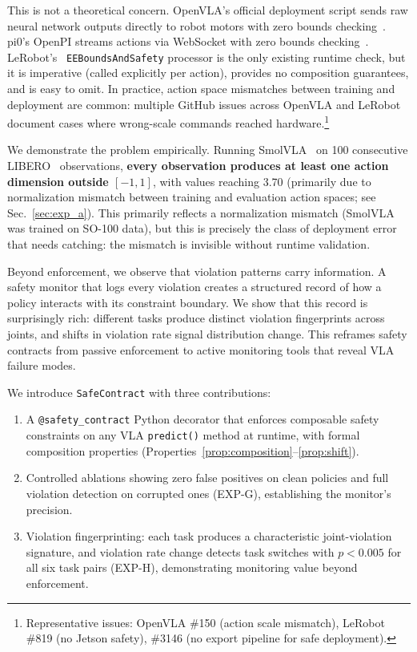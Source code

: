 \documentclass[conference]{IEEEtran}
\begin{document}
This is not a theoretical concern.
OpenVLA's official deployment script sends raw neural network outputs directly to robot motors with zero bounds checking~\cite{openvla}.
pi0's OpenPI streams actions via WebSocket with zero bounds checking~\cite{pi0}.
LeRobot's~\cite{lerobot} \texttt{EEBoundsAndSafety} processor is the only existing runtime check, but it is imperative (called explicitly per action), provides no composition guarantees, and is easy to omit.
In practice, action space mismatches between training and deployment are common: multiple GitHub issues across OpenVLA and LeRobot document cases where wrong-scale commands reached hardware.\footnote{Representative issues: OpenVLA \#150 (action scale mismatch), LeRobot \#819 (no Jetson safety), \#3146 (no export pipeline for safe deployment).}

We demonstrate the problem empirically.
Running SmolVLA~\cite{smolvla} on 100 consecutive LIBERO~\cite{libero} observations, \textbf{every observation produces at least one action dimension outside $[-1, 1]$}, with values reaching 3.70 (primarily due to normalization mismatch between training and evaluation action spaces; see Sec.~\ref{sec:exp_a}).
This primarily reflects a normalization mismatch (SmolVLA was trained on SO-100 data), but this is precisely the class of deployment error that needs catching: the mismatch is invisible without runtime validation.

Beyond enforcement, we observe that violation patterns carry information.
A safety monitor that logs every violation creates a structured record of how a policy interacts with its constraint boundary.
We show that this record is surprisingly rich: different tasks produce distinct violation fingerprints across joints, and shifts in violation rate signal distribution change.
This reframes safety contracts from passive enforcement to active monitoring tools that reveal VLA failure modes.

We introduce \texttt{SafeContract} with three contributions:
\begin{enumerate}
    \item A \texttt{@safety\_contract} Python decorator that enforces composable safety constraints on any VLA \texttt{predict()} method at runtime, with formal composition properties (Properties~\ref{prop:composition}--\ref{prop:shift}).
    \item Controlled ablations showing zero false positives on clean policies and full violation detection on corrupted ones (EXP-G), establishing the monitor's precision.
    \item Violation fingerprinting: each task produces a characteristic joint-violation signature, and violation rate change detects task switches with $p < 0.005$ for all six task pairs (EXP-H), demonstrating monitoring value beyond enforcement.
\end{enumerate}
\end{document}
